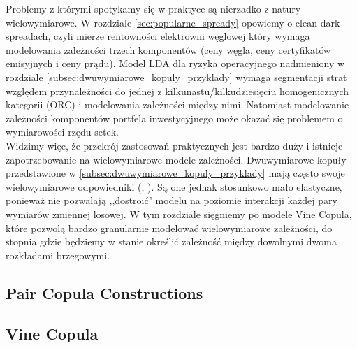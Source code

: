 Problemy z którymi spotykamy się w praktyce są nierzadko z natury wielowymiarowe. W rozdziale \ref{sec:popularne_spready} opowiemy o clean dark spreadach, czyli mierze rentowności elektrowni węglowej który wymaga modelowania zależności trzech komponentów (ceny węgla, ceny certyfikatów emisyjnych i ceny prądu). Model LDA dla ryzyka operacyjnego nadmieniony w rozdziale \ref{subsec:dwuwymiarowe_kopuly_przyklady} wymaga segmentacji strat względem przynależności do jednej z kilkunastu/kilkudziesięciu homogenicznych kategorii (ORC) i modelowania zależności między nimi. Natomiast modelowanie zależności komponentów portfela inwestycyjnego może okazać się problemem o wymiarowości rzędu setek.\\
Widzimy więc, że przekrój zastosowań praktycznych jest bardzo duży i istnieje zapotrzebowanie na wielowymiarowe modele zależności. Dwuwymiarowe kopuły przedstawione w \ref{subsec:dwuwymiarowe_kopuly_przyklady} mają często swoje wielowymiarowe odpowiedniki (\cite{Cherubini_Copula_Methods_in_Finance}, \cite{Kurowicka_Dependence_Modeling}). Są one jednak stosunkowo mało elastyczne, ponieważ nie pozwalają ,,dostroić" modelu na poziomie interakcji każdej pary wymiarów zmiennej losowej. W tym rozdziale sięgniemy po modele Vine Copula, które pozwolą bardzo granularnie modelować wielowymiarowe zależności, do stopnia gdzie będziemy w stanie określić zależność między dowolnymi dwoma rozkładami brzegowymi.\\

\subsection{Pair Copula Constructions}
\label{subsec:pair_copula_constructions}

	
\subsection{Vine Copula}
\label{subsec:vine_copula}


